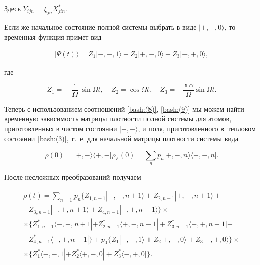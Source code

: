 Здесь $Y_{ijn}= \xi_{jn} X_{jin}^*$.



Если же начальное состояние полной системы выбрать в виде $|+,-, 0 \rangle$, то временная функция примет вид

\begin{gather}

|\Psi(t)\rangle = Z_{1} |-,-, 1\rangle + Z_{2} |+,-, 0\rangle  + Z_{3} |-,+, 0\rangle, 

\label{bash:(9)}

\end{gather}

где

$$

Z_{1} = - \frac{\imath}{ \Omega} \sin\Omega t, \quad Z_{2} = \cos\Omega t, \quad Z_{3} = - \frac{\imath \alpha}{ \Omega} \sin\Omega t.

$$



Теперь с использованием соотношений \eqref{bash:(8)}, \eqref{bash:(9)} мы можем найти временную зависимость матрицы плотности полной системы для атомов,  приготовленных в чистом состоянии $|+,-\rangle$,  и поля, приготовленного в~тепловом состоянии \eqref{bash:(3)}, т.~е. для начальной матрицы плотности системы вида

\begin{equation}

\rho(0) = |+,-\rangle \langle+,-| \rho_F(0) = \sum\limits_n p_n |+,-,n\rangle \langle +,-,n|.\label{bash:(10)}

\end{equation}



После несложных преобразований получаем

\begin{multline}

 \rho(t) = \sum\limits_{n=1} p_{n} \bigl\{ Z_{1,n-1} |-,-,n+1\rangle +   Z_{2,n-1} |+,-,n+1\rangle +  

 \\

 + Z_{3,n-1} |-,+,n+1\rangle +

 Z_{4,n-1} |+,+,n-1\rangle \bigr \} \times 

\\

\times 

 \bigl \{ Z^*_{1,n-1} \langle -,-,n+1|+   Z^*_{2,n-1} \langle +,-,n+1| +  Z^*_{3,n-1} \langle -,+,n+1| +

 \\ +

 Z^*_{4,n-1} \langle +,+,n-1| \bigr \} + p_0 \bigl \{ Z_{1} |-,-, 1\rangle +   

 Z_{2} |+,-, 0\rangle +  Z_{3} |-,+, 0\rangle\bigr \} \times  

\\ \times  \bigl \{ Z^*_{1} \langle -,-, 1| +   Z^*_{2} \langle +,-, 0| +  Z^*_{3} \langle -,+, 0|\bigr \}.

\label{bash:(11)}

\end{multline}

